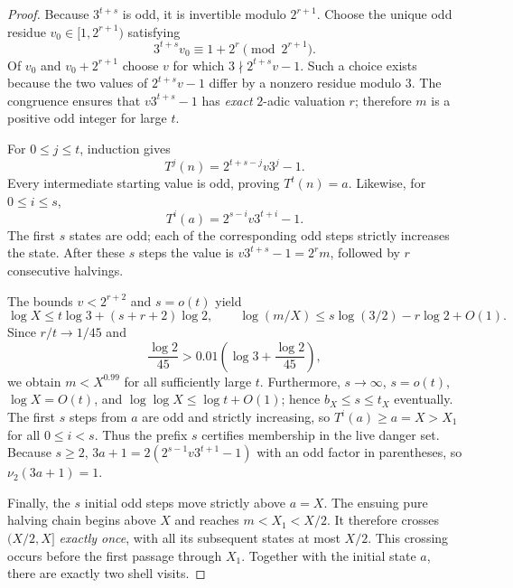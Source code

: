 \documentclass[11pt,a4paper]{article}
\begin{document}
\begin{proof}
Because $3^{t+s}$ is odd, it is invertible modulo $2^{r+1}$.
Choose the unique odd residue $v_0\in[1,2^{r+1})$ satisfying
\[
 3^{t+s}v_0\equiv1+2^r\pmod{2^{r+1}}.
\]
Of $v_0$ and $v_0+2^{r+1}$ choose $v$ for which
$3\nmid 2^{t+s}v-1$. Such a choice exists because the two values of
$2^{t+s}v-1$ differ by a nonzero residue modulo $3$. The congruence
ensures that $v3^{t+s}-1$ has \emph{exact} $2$-adic valuation $r$;
therefore $m$ is a positive odd integer for large $t$.

For $0\le j\le t$, induction gives
\[
 T^j(n)=2^{t+s-j}v3^j-1.
\]
Every intermediate starting value is odd, proving $T^t(n)=a$.
Likewise, for $0\le i\le s$,
\[
 T^i(a)=2^{s-i}v3^{t+i}-1.
\]
The first $s$ states are odd; each of the corresponding odd
steps strictly increases the state.  After these $s$ steps the
value is $v3^{t+s}-1=2^rm$, followed by $r$ consecutive halvings.

The bounds $v<2^{r+2}$ and $s=o(t)$ yield
\[
 \log X\le t\log3+(s+r+2)\log2,
 \qquad
 \log(m/X)\le s\log(3/2)-r\log2+O(1).
\]
Since $r/t\to1/45$ and
\[
 \frac{\log2}{45}>0.01\left(\log3+\frac{\log2}{45}\right),
\]
we obtain $m<X^{0.99}$ for all sufficiently large $t$.
Furthermore, $s\to\infty$, $s=o(t)$, $\log X=O(t)$, and
$\log\log X\le\log t+O(1)$; hence $b_X\le s\le t_X$ eventually.
The first $s$ steps from $a$ are odd and strictly increasing, so
$T^i(a)\ge a=X>X_1$ for all $0\le i<s$. Thus the prefix $s$
certifies membership in the live danger set. Because $s\ge2$,
$3a+1=2(2^{s-1}v3^{t+1}-1)$ with an odd factor in parentheses,
so $\nu_2(3a+1)=1$.

Finally, the $s$ initial odd steps move strictly above $a=X$.
The ensuing pure halving chain begins above $X$ and reaches
$m<X_1<X/2$. It therefore crosses $(X/2,X]$ \emph{exactly once},
with all its subsequent states at most $X/2$. This crossing occurs
before the first passage through $X_1$. Together with the initial
state $a$, there are exactly two shell visits.
\end{proof}
\end{document}
